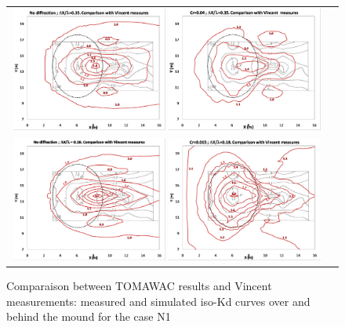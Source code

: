 \begin{figure}[H]
  \centering
\begin{tabular}{cc}
    \includegraphics[width=0.49\textwidth]{iso-Kd_nodiff_dx035.jpg}
    \includegraphics[width=0.49\textwidth]{iso-Kd_cr004-dx035.jpg}\\
    \includegraphics[width=0.49\textwidth]{iso-Kd_nodiff_dx018.jpg}
    \includegraphics[width=0.49\textwidth]{iso-Kd_cr0015_dx018.jpg}\\
\end{tabular}
\caption{Comparaison between TOMAWAC results and Vincent measurements: measured and simulated iso-Kd curves over and behind the mound for the case N1}
\label {comparisonN1}
\end{figure}


